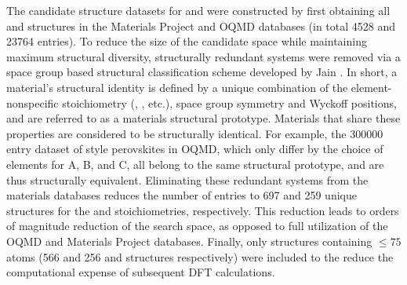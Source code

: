 %
%
%
The candidate structure datasets for \IrOtwo and \IrOthree were constructed by first obtaining all \ABtwo and \ABthree structures in the Materials Project\cite{Jain2013} and OQMD\cite{Kirklin2015} databases
(in total \num{4528} \ABtwo and \num{23764} \ABthree entries).
%
To reduce the size of the candidate space while maintaining maximum structural diversity, structurally redundant systems were removed via a space group based structural classification scheme developed by Jain  \cite{Jain2018}.
%
In short, a material's structural identity is defined by a unique combination of the element-nonspecific stoichiometry (\ABtwo, \ABthree, etc.), space group symmetry and Wyckoff positions, and are referred to as a materials structural prototype.
%
Materials that share these properties are considered to be structurally identical.
%
For example, the \num{300000} entry dataset of \ABOthree style perovskites in OQMD, which only differ by the choice of elements for A, B, and C, all belong to the same structural prototype, and are thus structurally equivalent.
%
Eliminating these redundant systems from the materials databases reduces the number of entries to \num{697} and \num{259} unique structures for the \ABtwo and \ABthree stoichiometries, respectively.
%
This reduction leads to orders of magnitude reduction of the search space, as opposed to full utilization of the OQMD and Materials Project databases.
%
Finally, only structures containing $\leq\num{75}$ atoms
(\num{566} and \num{256} \ABtwo and \ABthree structures respectively)
were included to the reduce the computational expense of subsequent DFT calculations.

